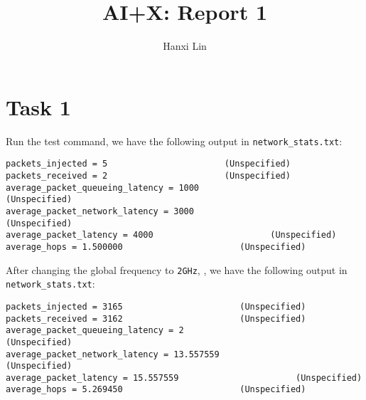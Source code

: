 \documentclass{article}
\title{\bf\huge AI+X: Report 1}
\author{Hanxi Lin}
\begin{document}
\maketitle

\section*{Task 1}
Run the test command, we have the following output in \verb`network_stats.txt`:
\begin{lstlisting}[language={}]
packets_injected = 5                       (Unspecified)
packets_received = 2                       (Unspecified)
average_packet_queueing_latency = 1000                       (Unspecified)
average_packet_network_latency = 3000                       (Unspecified)
average_packet_latency = 4000                       (Unspecified)
average_hops = 1.500000                       (Unspecified)
\end{lstlisting}
After changing the global frequency to \verb|2GHz|, , we have the following output in \verb`network_stats.txt`:
\begin{lstlisting}[language={}]
packets_injected = 3165                       (Unspecified)
packets_received = 3162                       (Unspecified)
average_packet_queueing_latency = 2                       (Unspecified)
average_packet_network_latency = 13.557559                       (Unspecified)
average_packet_latency = 15.557559                       (Unspecified)
average_hops = 5.269450                       (Unspecified)
\end{lstlisting}
\end{document}
